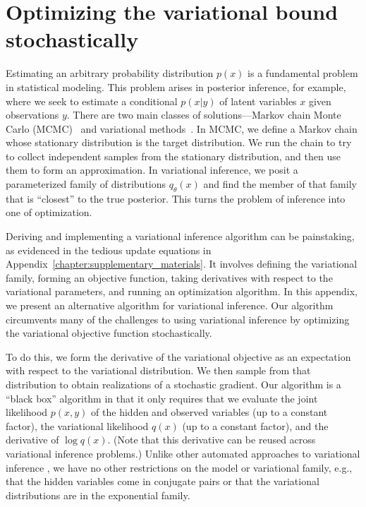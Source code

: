 \chapter{Optimizing the variational bound stochastically}
\label{chapter:stochastic_variational_optimization}
\label{sec:stochastic_variational_optimization}

Estimating an arbitrary probability distribution $p(x)$ is a
fundamental problem in statistical modeling.  This problem arises in
posterior inference, for example, where we seek to estimate a
conditional $p(x | y)$ of latent variables $x$ given observations $y$.
There are two main classes of solutions---Markov chain Monte Carlo
(MCMC)~\citep{bishop:2006} and variational methods~\citep{jordan:1999}.
In MCMC, we define a Markov chain whose stationary distribution is the
target distribution.  We run the chain to try to collect independent
samples from the stationary distribution, and then use them to form an
approximation.  In variational inference, we posit a parameterized
family of distributions $q_\theta(x)$ and find the member of that
family that is ``closest'' to the true posterior.  This turns the
problem of inference into one of optimization.

Deriving and implementing a variational inference algorithm can be
painstaking, as evidenced in the tedious update equations in
Appendix~\ref{chapter:supplementary_materials}.  It involves defining the variational
family, forming an objective function, taking derivatives with respect
to the variational parameters, and running an optimization algorithm.
In this appendix, we present an alternative algorithm for variational
inference.  Our algorithm circumvents many of the challenges to using
variational inference by optimizing the variational objective function
stochastically.

To do this, we form the derivative of the variational objective as an
expectation with respect to the variational distribution. We then
sample from that distribution to obtain realizations of a stochastic
gradient.  Our algorithm is a ``black box'' algorithm in that it only
requires that we evaluate the joint likelihood $p(x, y)$ of the hidden
and observed variables (up to a constant factor), the variational
likelihood $q(x)$ (up to a constant factor), and the derivative of
$\log q(x)$.  (Note that this derivative can be reused across
variational inference problems.)  Unlike other automated approaches to
variational inference \citep{winn:2004}, we have no other restrictions
on the model or variational family, e.g., that the hidden variables
come in conjugate pairs or that the variational distributions are in
the exponential family.

